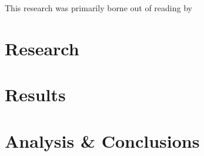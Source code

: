 \documentclass{uvamscse}	%
\begin{document}
This research was primarily borne out of reading  by \citeauthor{Buntain2014}\cite{Buntain2014}

\chapter{Research}

\chapter{Results}

\chapter{Analysis \& Conclusions}


\printbibliography

\newpage

\end{document}
